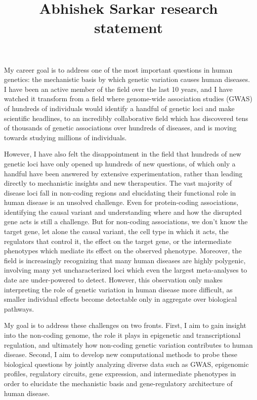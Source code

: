 \documentclass[11pt]{article}
\date{}
\title{Abhishek Sarkar research statement}
\begin{document}
\begin{center}
  \large\bfseries\makeatletter\@title\makeatother
\end{center}

My career goal is to address one of the most important questions in human
genetics: the mechanistic basis by which genetic variation causes human
diseases. I have been an active member of the field over the last 10 years, and
I have watched it transform from a field where genome-wide association studies
(GWAS) of hundreds of individuals would identify a handful of genetic loci and
make scientific headlines, to an incredibly collaborative field which has
discovered tens of thousands of genetic associations over hundreds of diseases,
and is moving towards studying millions of individuals.

However, I have also felt the disappointment in the field that hundreds of new
genetic loci have only opened up hundreds of new questions, of which only a
handful have been answered by extensive experimentation, rather than leading
directly to mechanistic insights and new therapeutics. The vast majority of
disease loci fall in non-coding regions and elucidating their functional role
in human disease is an unsolved challenge. Even for protein-coding
associations, identifying the causal variant and understanding where and how
the disrupted gene acts is still a challenge. But for non-coding associations,
we don't know the target gene, let alone the causal variant, the cell type in
which it acts, the regulators that control it, the effect on the target gene,
or the intermediate phenotypes which mediate its effect on the observed
phenotype. Moreover, the field is increasingly recognizing that many human
diseases are highly polygenic, involving many yet uncharacterized loci which
even the largest meta-analyses to date are under-powered to detect. However,
this observation only makes interpreting the role of genetic variation in human
disease more difficult, as smaller individual effects become detectable only in
aggregate over biological pathways.

My goal is to address these challenges on two fronts. First, I aim to gain
insight into the non-coding genome, the role it plays in epigenetic and
transcriptional regulation, and ultimately how non-coding genetic variation
contributes to human disease. Second, I aim to develop new computational
methods to probe these biological questions by jointly analyzing diverse data
such as GWAS, epigenomic profiles, regulatory circuits, gene expression, and
intermediate phenotypes in order to elucidate the mechanistic basis and
gene-regulatory architecture of human disease.
\end{document}
